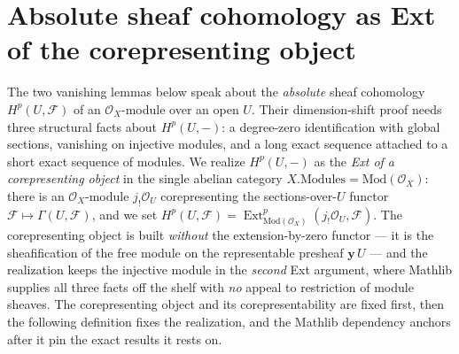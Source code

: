 \section{Absolute sheaf cohomology as Ext of the corepresenting object}

The two vanishing lemmas below speak about the \emph{absolute} sheaf cohomology
\(H^p(U, \mathcal{F})\) of an \(\mathcal{O}_X\)-module over an open \(U\). Their
dimension-shift proof needs three structural facts about \(H^p(U, -)\): a degree-zero
identification with global sections, vanishing on injective modules, and a long exact
sequence attached to a short exact sequence of modules. We realize \(H^p(U, -)\) as the
\emph{Ext of a corepresenting object} in the single abelian category
\(X.\mathrm{Modules} = \mathrm{Mod}(\mathcal{O}_X)\): there is an
\(\mathcal{O}_X\)-module \(j_!\mathcal{O}_U\) corepresenting the
sections-over-\(U\) functor \(\mathcal{F} \mapsto \Gamma(U, \mathcal{F})\), and we set
\(H^p(U, \mathcal{F}) = \operatorname{Ext}^p_{\mathrm{Mod}(\mathcal{O}_X)}(j_!\mathcal{O}_U,
\mathcal{F})\). The corepresenting object is built \emph{without} the extension-by-zero
functor — it is the sheafification of the free module on the representable presheaf
\(\mathbf{y}\,U\) — and the realization keeps the injective module in the \emph{second}
Ext argument, where Mathlib supplies all three facts off the shelf with \emph{no} appeal
to restriction of module sheaves. The corepresenting object and its corepresentability
are fixed first, then the following definition fixes the realization, and the Mathlib
dependency anchors after it pin the exact results it rests on.

